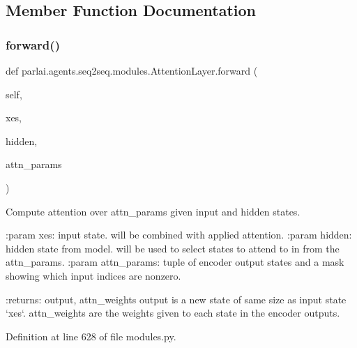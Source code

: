 \subsection{Member Function Documentation}
\mbox{\label{classparlai_1_1agents_1_1seq2seq_1_1modules_1_1AttentionLayer_a1c840562c4d3d0a715b4d5ddb1b8bafe}} 
\subsubsection{\texorpdfstring{forward()}{forward()}}
{\footnotesize\ttfamily def parlai.\+agents.\+seq2seq.\+modules.\+Attention\+Layer.\+forward (\begin{DoxyParamCaption}\item[{}]{self,  }\item[{}]{xes,  }\item[{}]{hidden,  }\item[{}]{attn\+\_\+params }\end{DoxyParamCaption})}

\begin{DoxyVerb}Compute attention over attn_params given input and hidden states.

:param xes:         input state. will be combined with applied
            attention.
:param hidden:      hidden state from model. will be used to select
            states to attend to in from the attn_params.
:param attn_params: tuple of encoder output states and a mask showing
            which input indices are nonzero.

:returns: output, attn_weights
  output is a new state of same size as input state `xes`.
  attn_weights are the weights given to each state in the
  encoder outputs.
\end{DoxyVerb}
 

Definition at line 628 of file modules.\+py.


